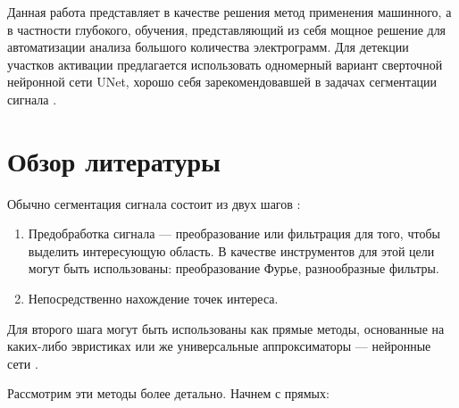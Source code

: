 Данная работа представляет в качестве решения метод применения машинного, а в
частности глубокого, обучения, представляющий из себя мощное решение для
автоматизации анализа большого количества электрограмм. Для детекции участков
активации предлагается использовать одномерный вариант сверточной нейронной
сети UNet, хорошо себя зарекомендовавшей в задачах сегментации сигнала \cite{victor}.

\section{Обзор литературы}
Обычно сегментация сигнала состоит из двух шагов \cite{ecg-segmentation}:

\begin{enumerate}
	\item Предобработка сигнала --- преобразование или фильтрация для того,
	чтобы выделить интересующую область. В качестве инструментов для этой цели
	могут быть использованы: преобразование Фурье, разнообразные фильтры.

	\item Непосредственно нахождение точек интереса.

\end{enumerate}

Для второго шага могут быть использованы как прямые методы, основанные на
каких-либо эвристиках \cite{euristic-1, euristic-2, euristic-3, euristic-4,
	euristic-5} или же универсальные аппроксиматоры --- нейронные сети
\cite{victor}.

Рассмотрим эти методы более детально. Начнем с прямых:

\vspace*{\baselineskip}


